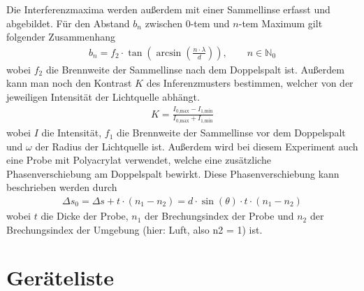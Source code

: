 \documentclass{article}
\begin{document}
Die Interferenzmaxima werden außerdem mit einer Sammellinse erfasst und abgebildet. Für den Abstand $b_n$ zwischen $0$-tem und $n$-tem Maximum gilt folgender Zusammenhang 
\begin{align}
b_n = f_2 \cdot \tan\left( \operatorname{arcsin}\left(\frac{n\cdot\lambda}{d}\right)\right), \qquad n\in\mathbb{N}_0
\end{align}
wobei $f_2$ die Brennweite der Sammellinse nach dem Doppelspalt ist. Außerdem kann man noch den Kontrast $K$ des Inferenzmusters bestimmen, welcher von der jeweiligen Intensität der Lichtquelle abhängt.
\begin{align}
K = \frac{I_\text{0,max}-I_\text{1,min}}{I_\text{0,max}+I_\text{1,min}} \label{eq:kontrast}
\end{align}
wobei $I$ die Intensität, $f_1$ die Brennweite der Sammellinse vor dem Doppelspalt und $\omega$ der Radius der Lichtquelle ist. Außerdem wird bei diesem Experiment auch eine Probe mit Polyacrylat verwendet, welche eine zusätzliche Phasenverschiebung am Doppelspalt bewirkt. Diese Phasenverschiebung kann beschrieben werden durch
\begin{align}
\Delta s_0 = \Delta s + t\cdot (n_1-n_2) = d\cdot\sin(\theta)\cdot t\cdot (n_1-n_2)
\end{align}
wobei $t$ die Dicke der Probe, $n_1$ der Brechungsindex der Probe und $n_2$ der Brechungsindex der Umgebung (hier: Luft, also n2 = 1) ist.







\section{Geräteliste}
\end{document}
